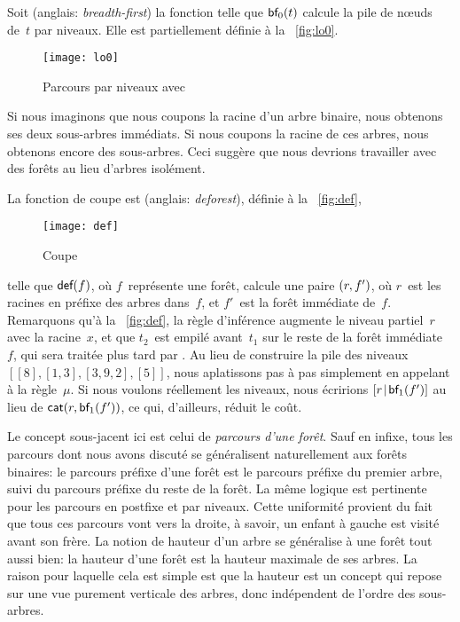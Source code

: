 Soit  (anglais:
\emph{breadth-first}) la fonction telle que \(\textsf{bf}_0(t)\)
calcule la pile de nœuds de~\(t\) par niveaux. Elle est
partiellement définie à la \fig~\vref{fig:lo0}.
\begin{figure}[t]
\centering
\texttt{[image: lo0]}
\caption{Parcours par niveaux avec }
\label{fig:lo0}
\end{figure}
Si nous imaginons que nous coupons la racine d'un arbre binaire, nous
obtenons ses deux sous-arbres immédiats. Si nous coupons la racine de
ces arbres, nous obtenons encore des sous-arbres. Ceci suggère que
nous devrions travailler avec des forêts au lieu
d'arbres isolément.

La fonction de coupe est 
(anglais: \emph{deforest}), définie à la \fig~\vref{fig:def},
\begin{figure}
\abovedisplayskip=0pt
\belowdisplayskip=0pt
\centering
\texttt{[image: def]}
\caption{Coupe}
\label{fig:def}
\end{figure}
telle que \(\textsf{def}(f)\), où \(f\)~représente une forêt, calcule une
paire \(({r},{f'})\), où \(r\)~est les racines en préfixe des arbres
dans~\(f\), et \(f'\)~est la forêt immédiate de~\(f\). Remarquons qu'à
la \fig~\vref{fig:def}, la règle d'inférence augmente le niveau
partiel~\(r\) avec la racine~\(x\), et que \(t_2\)~est empilé
avant~\(t_1\) sur le reste de la forêt immédiate~\(f\), qui sera
traitée plus tard par . Au
lieu de construire la pile des niveaux \([[8], [1,3], [3,9,2], [5]]\),
nous aplatissons pas à pas simplement en appelant
 à la règle~\(\mu\). Si nous voulons
réellement les niveaux, nous écririons
\([{r}\!\mid\!{\textsf{bf}_1(f')}]\) au lieu de
\(\textsf{cat}(r,\textsf{bf}_1(f'))\), ce qui,
d'ailleurs, réduit le coût.

Le concept sous-jacent ici est celui de \emph{parcours d'une
  forêt}. Sauf en infixe, tous les parcours dont nous avons discuté se
généralisent naturellement aux forêts binaires: le parcours préfixe
d'une forêt est le parcours préfixe du premier arbre, suivi du
parcours préfixe du reste de la forêt. La même logique est pertinente
pour les parcours en postfixe et par niveaux. Cette uniformité
provient du fait que tous ces parcours vont vers la droite, à savoir,
un enfant à gauche est visité avant son frère. La notion de
hauteur d'un arbre se généralise à une forêt tout
aussi bien: la hauteur d'une forêt est la hauteur maximale de ses
arbres. La raison pour laquelle cela est simple est que la hauteur est
un concept qui repose sur une vue purement verticale des arbres, donc
indépendent de l'ordre des sous-arbres.

